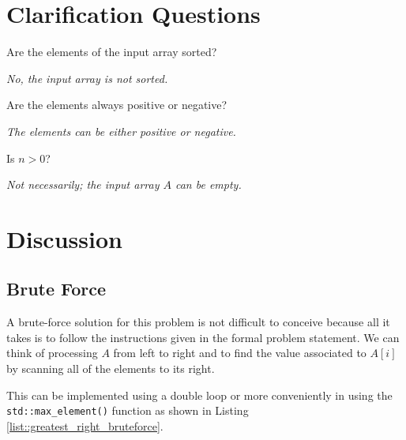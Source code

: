 \section{Clarification Questions}

\begin{QandA}
	\begin{questionitem} \begin{question} Are the elements of the input array sorted?  \end{question} 	 
    \begin{answered}
		\textit{No, the input array is not sorted.}
	\end{answered} \end{questionitem}
	
	\begin{questionitem} \begin{question} Are the elements always positive or negative?  \end{question} 	 
    \begin{answered}
		\textit{The elements can be either positive or negative.}
	\end{answered} \end{questionitem}

	\begin{questionitem} \begin{question} Is $n>0$?  \end{question} 	 
		\begin{answered}
			\textit{Not necessarily; the input  array $A$ can be empty.}
		\end{answered} \end{questionitem}
	
\end{QandA}

\section{Discussion}

\subsection{Brute Force}
A brute-force solution for this problem is not difficult to conceive because all it takes is to follow the instructions given in the formal problem statement. 
We can think of processing $A$ from left to right and to find the value associated to $A[i]$ by scanning all of the elements to its right. 


This can be implemented using a double loop or more conveniently in \CC using the \texttt{std::max\_element()} function as shown in Listing \ref{list::greatest_right_bruteforce}. 

